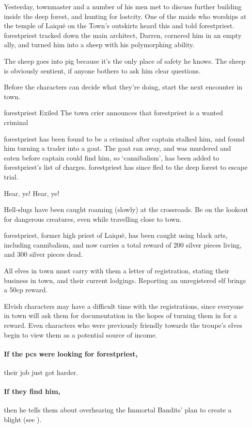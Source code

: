 Yesterday, \gls{townmaster} and a number of his men met to discuss further building inside the deep forest, and hunting for \gls{lostcity}.
One of the maids who worships at the temple of Laiqu\"{e} on the Town's outskirts heard this and told \gls{forestpriest}.
\Gls{forestpriest} tracked down the main architect, Darren, cornered him in an empty ally, and turned him into a sheep with his polymorphing ability.

The sheep goes into \gls{pig} because it's the only place of safety he knows.  The sheep is obviously sentient, if anyone bothers to ask him clear questions.

Before the characters can decide what they're doing, start the next encounter in \gls{town}.

{\Gls{forestpriest} Exiled}%
{The town crier announces that \gls{forestpriest} is a wanted criminal}%

\Gls{forestpriest} has been found to be a criminal after \gls{captain} stalked him, and found him turning a trader into a goat.
The goat ran away, and was murdered and eaten before \gls{captain} could find him, so `cannibalism', has been added to \gls{forestpriest}'s list of charges.
\Gls{forestpriest} has since fled to the deep forest to escape trial.

\begin{speechtext}

  Hear, ye! Hear, ye!

  Hell-slugs have been caught roaming (slowly) at the crossroads.
  Be on the lookout for dangerous creatures, even while travelling close to \gls{town}.

  \Gls{forestpriest}, former high priest of Laiqu\"{e}, has been caught using black arts, including cannibalism, and now carries a total reward of 200 silver pieces living, and 300 silver pieces dead.

  All elves in \gls{town} must carry with them a letter of registration, stating their business in town, and their current lodgings.
  Reporting an unregistered elf brings a 50cp reward.

\end{speechtext}

Elvish characters may have a difficult time with the registrations, since everyone in \gls{town} will ask them for documentation in the hopes of turning them in for a reward.
Even characters who were previously friendly towards the troupe's elves begin to view them as a potential source of income.

\paragraph{If the \glspl{pc} were looking for \gls{forestpriest},}
their job just got harder.

\paragraph{If they find him,}
then he tells them about overhearing the Immortal Bandits' plan to create a \gls{blight} (see ).

\stopcontents[sq]

